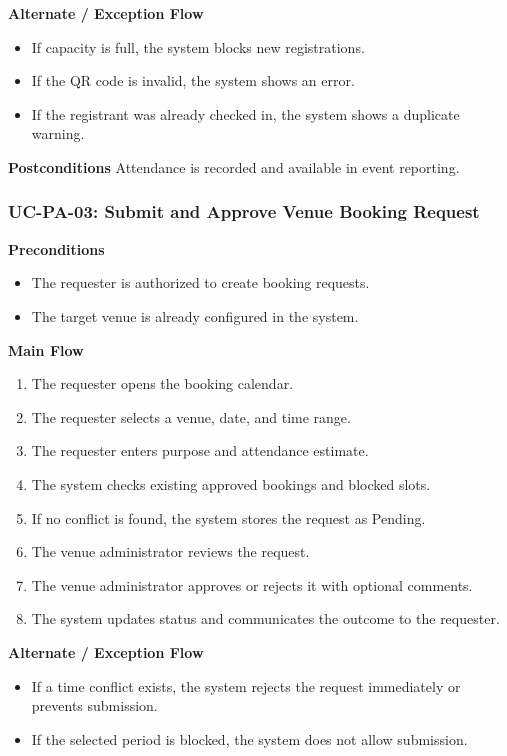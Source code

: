\documentclass[12pt,a4paper]{article}
\begin{document}
\textbf{Alternate / Exception Flow}
\begin{itemize}[nosep]
\item If capacity is full, the system blocks new registrations.
\item If the QR code is invalid, the system shows an error.
\item If the registrant was already checked in, the system shows a duplicate warning.
\end{itemize}

\textbf{Postconditions}
Attendance is recorded and available in event reporting.

\subsubsection*{UC-PA-03: Submit and Approve Venue Booking Request}

\textbf{Preconditions}
\begin{itemize}[nosep]
\item The requester is authorized to create booking requests.
\item The target venue is already configured in the system.
\end{itemize}

\textbf{Main Flow}
\begin{enumerate}[nosep]
\item The requester opens the booking calendar.
\item The requester selects a venue, date, and time range.
\item The requester enters purpose and attendance estimate.
\item The system checks existing approved bookings and blocked slots.
\item If no conflict is found, the system stores the request as Pending.
\item The venue administrator reviews the request.
\item The venue administrator approves or rejects it with optional comments.
\item The system updates status and communicates the outcome to the requester.
\end{enumerate}

\textbf{Alternate / Exception Flow}
\begin{itemize}[nosep]
\item If a time conflict exists, the system rejects the request immediately or prevents submission.
\item If the selected period is blocked, the system does not allow submission.
\end{itemize}
\end{document}
